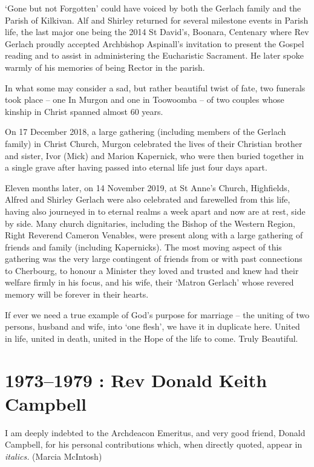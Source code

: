 `Gone but not Forgotten' could have voiced by both the Gerlach family
and the Parish of Kilkivan. Alf and Shirley returned for several
milestone events in Parish life, the last major one being the 2014 St
David's, Boonara, Centenary where Rev Gerlach proudly accepted
Archbishop Aspinall's invitation to present the Gospel reading and to
assist in administering the Eucharistic Sacrament. He later spoke warmly
of his memories of being Rector in the parish.

In what some may consider a sad, but rather beautiful twist of fate, two
funerals took place -- one In Murgon and one in Toowoomba -- of two
couples whose kinship in Christ spanned almost 60 years.

On 17 December 2018, a large gathering (including members of the Gerlach
family) in Christ Church, Murgon celebrated the lives of their Christian
brother and sister, Ivor (Mick) and Marion Kapernick, who were then
buried together in a single grave after having passed into eternal life
just four days apart.

Eleven months later, on 14 November 2019, at St Anne's Church,
Highfields, Alfred and Shirley Gerlach were also celebrated and
farewelled from this life, having also journeyed in to eternal realms a
week apart and now are at rest, side by side. Many church dignitaries,
including the Bishop of the Western Region, Right Reverend Cameron
Venables, were present along with a large gathering of friends and
family (including Kapernicks). The most moving aspect of this gathering
was the very large contingent of friends from or with past connections
to Cherbourg, to honour a Minister they loved and trusted and knew had
their welfare firmly in his focus, and his wife, their `Matron Gerlach'
whose revered memory will be forever in their hearts.

If ever we need a true example of God's purpose for marriage -- the
uniting of two persons, husband and wife, into `one flesh', we have it
in duplicate here. United in life, united in death, united in the Hope
of the life to come. Truly Beautiful.

\printendnotes
\setcounter{endnote}{0}
\chapter{1973--1979 : Rev Donald Keith
Campbell}

I am deeply indebted to the Archdeacon Emeritus, and very good friend,
Donald Campbell, for his personal contributions which, when directly
quoted, appear in \emph{italics.} (Marcia McIntosh)

